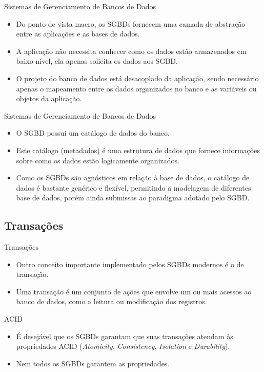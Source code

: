 \documentclass[11pt]{beamer}
\begin{document}
\begin{frame}{Sistemas de Gerenciamento de Bancos de Dados}
    \begin{itemize}
        \item Do ponto de vista macro, os SGBDs fornecem uma camada de abstração entre as aplicações e as bases de dados.
        \item A aplicação não necessita conhecer como os dados estão armazenados em baixo nível, ela apenas solicita os dados aos SGBD.
        \item O projeto do banco de dados está desacoplado da aplicação, sendo necessário apenas o mapeamento entre os dados organizados no banco e as variáveis ou objetos da aplicação.
    \end{itemize}
\end{frame}

\begin{frame}{Sistemas de Gerenciamento de Bancos de Dados}
    \begin{itemize}
        \item O SGBD possui um catálogo de dados do banco.
        \item Este catálogo (metadados) é uma estrutura de dados que fornece informações sobre como os dados estão logicamente organizados.
        \item Como os SGBDs são agnósticos em relação à base de dados, o catálogo de dados é bastante genérico e flexível, permitindo a modelagem de diferentes base de dados, porém ainda submissas ao paradigma adotado pelo SGBD.
    \end{itemize}
\end{frame}

\subsection{Transações}

\begin{frame}{Transações}
    \begin{itemize}
        \item Outro conceito importante implementado pelos SGBDs modernos é o de transação.
        \item Uma transação é um conjunto de ações que envolve um ou mais acessos ao banco de dados, como a leitura ou modificação dos registros.
    \end{itemize}
\end{frame}

\begin{frame}{ACID}
    \begin{itemize}
        \item É desejável que os SGBDs garantam que suas transações atendam às propriedades ACID (\textit{Atomicity}, \textit{Consistency}, \textit{Isolation} e \textit{Durability}).
        \item Nem todos os SGBDs garantem as propriedades.
    \end{itemize}
\end{frame}
\end{document}

